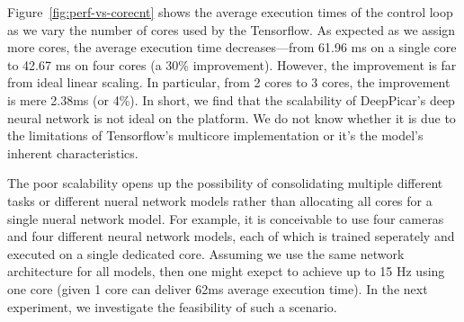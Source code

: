 Figure~\ref{fig:perf-vs-corecnt} shows the average execution times of
the control loop as we vary the number of cores used by the
Tensorflow. As expected as we assign more cores, the average execution
time decreases---from 61.96 ms on a single core to 42.67 ms on four
cores (a 30\% improvement). However, the improvement is far from ideal
linear scaling. In particular, from 2 cores to 3 cores, the
improvement is mere 2.38ms (or 4\%). In short, we find that the
scalability of DeepPicar's deep neural network is not ideal on the
platform. We do not know whether it is due to the limitations of
Tensorflow's multicore implementation or it's the model's inherent
characteristics. 

The poor scalability opens up the possibility of consolidating
multiple different tasks or different nueral network models rather
than allocating all cores for a single nueral network model. For
example, it is conceivable to use four cameras and four different
neural network models, each of which is trained seperately and
executed on a single dedicated core. Assuming we use the same network
architecture for all models, then one might exepct to achieve up to
15 Hz using one core (given 1 core can deliver 62ms average
execution time). In the next experiment, we investigate the
feasibility of such a scenario.



